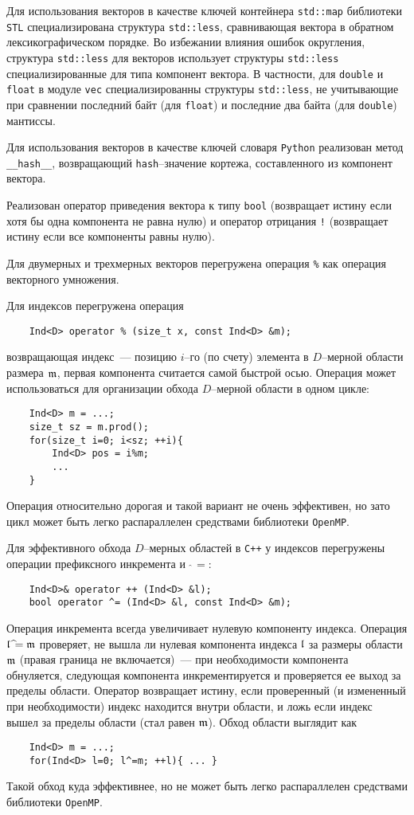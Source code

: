 Для использования векторов в качестве ключей контейнера \verb'std::map' библиотеки \verb'STL' специализирована структура
\verb'std::less', сравнивающая вектора в обратном лексикографическом порядке. Во избежании влияния ошибок округления,
структура \verb'std::less' для векторов использует структуры \verb'std::less' специализированные для типа компонент вектора. 
В частности, для  \verb'double' и \verb'float' в модуле \verb'vec' специализированны  структуры \verb'std::less',
не учитывающие при сравнении последний байт (для \verb'float') и последние два байта (для \verb'double') мантиссы.

Для использования векторов в качестве ключей словаря \verb'Python' реализован метод \verb'__hash__', 
возвращающий \verb'hash'--значение кортежа, составленного из компонент вектора.

Реализован оператор приведения вектора к типу \verb'bool' (возвращает истину если хотя бы одна компонента не равна нулю)
и оператор отрицания \verb'!' (возвращает истину если все компоненты равны нулю).

Для двумерных и трехмерных векторов перегружена операция \verb'%' как операция векторного умножения.

Для индексов перегружена операция 
\begin{verbatim}
    Ind<D> operator % (size_t x, const Ind<D> &m);
\end{verbatim}
возвращающая индекс~--- позицию $i$--го (по счету) элемента в $D$--мерной
области размера $\mathfrak{m}$, первая компонента считается самой быстрой осью. Операция может использоваться для
организации обхода $D$--мерной области в одном цикле:
\begin{verbatim}
    Ind<D> m = ...;
    size_t sz = m.prod();
    for(size_t i=0; i<sz; ++i){
        Ind<D> pos = i%m;
        ...
    }
\end{verbatim}
Операция относительно дорогая и такой вариант не очень эффективен, но зато цикл может 
быть легко распараллелен средствами библиотеки \verb'OpenMP'.

Для эффективного обхода $D$--мерных областей в {\tt C++} у индексов перегружены операции префиксного инкремента
и $\,\widehat{~}\!\!=$:
\begin{verbatim}
	Ind<D>& operator ++ (Ind<D> &l);
	bool operator ^= (Ind<D> &l, const Ind<D> &m);
\end{verbatim}
Операция инкремента всегда увеличивает нулевую компоненту индекса. Операция 
$\mathfrak{l}\,\widehat{~}\!\!=\mathfrak{m}$ проверяет, не вышла ли нулевая компонента индекса $\mathfrak{l}$ за размеры области $\mathfrak{m}$ 
(правая граница не включается)~---
при необходимости компонента обнуляется, следующая компонента инкрементируется и проверяется ее выход за пределы области.
Оператор возвращает истину, если проверенный (и измененный при необходимости) индекс находится
внутри области, и ложь если индекс вышел за пределы области (стал равен $\mathfrak{m}$). Обход области выглядит как
\begin{verbatim}
    Ind<D> m = ...;
    for(Ind<D> l=0; l^=m; ++l){ ... }
\end{verbatim}
Такой обход куда эффективнее, но не может быть легко распараллелен средствами библиотеки \verb'OpenMP'.

